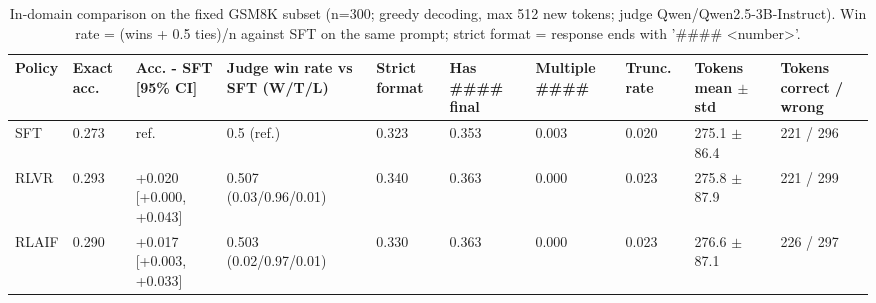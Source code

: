 \begin{table}[t]
\centering
\small
\caption{In-domain comparison on the fixed GSM8K subset (n=300; greedy decoding, max 512 new tokens; judge Qwen/Qwen2.5-3B-Instruct). Win rate = (wins + 0.5 ties)/n against SFT on the same prompt; strict format = response ends with '#### <number>'.}
\begin{tabular}{llllllllll}
\toprule
Policy & Exact acc. & Acc. - SFT [95\% CI] & Judge win rate vs SFT (W/T/L) & Strict format & Has #### final & Multiple #### & Trunc. rate & Tokens mean $\pm$ std & Tokens correct / wrong \\
\midrule
SFT & 0.273 & ref. & 0.5 (ref.) & 0.323 & 0.353 & 0.003 & 0.020 & 275.1 $\pm$ 86.4 & 221 / 296 \\
RLVR & 0.293 & +0.020 [+0.000, +0.043] & 0.507 (0.03/0.96/0.01) & 0.340 & 0.363 & 0.000 & 0.023 & 275.8 $\pm$ 87.9 & 221 / 299 \\
RLAIF & 0.290 & +0.017 [+0.003, +0.033] & 0.503 (0.02/0.97/0.01) & 0.330 & 0.363 & 0.000 & 0.023 & 276.6 $\pm$ 87.1 & 226 / 297 \\
\bottomrule
\end{tabular}
\end{table}

